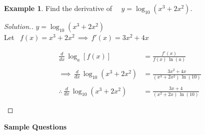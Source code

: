 \documentclass[11pt,a4paper]{article}
\theoremstyle{definition}
\newtheorem{example}[thm]{Example}
\newenvironment{solution}
  {\renewcommand{\qedsymbol}{}\begin{proof}[\textit{Solution}.]}
  {\end{proof}}
\begin{document}
\begin{example}

Find the derivative of $\quad \displaystyle{y = \log_{10}(x^3 + 2x^2)}$.
\end{example}
\begin{solution}

$y = \log_{10}(x^3 + 2x^2)$\\

Let \, $f(x) = x^3 + 2x^2\, \implies\, f'(x) = 3x^2 + 4x$

\begin{align*}
\frac{d}{dx}\, \log_a [f(x)] & = \frac{f'(x)}{f(x) \, \ln (a)}\\\\
\implies\, \frac{d}{dx}\, \log_{10}(x^3 + 2x^2) &  = \frac{3x^2 + 4x}{(x^3 + 2x^2)\, \ln (10)}\\\\
\therefore\, \frac{d}{dx}\, \log_{10}(x^3 + 2x^2) & = \frac{3x + 4}{(x^2 + 2x)\, \ln (10)}\\\\
\end{align*}









\vspace{1cm}
\end{solution}
\textbf{Sample Questions}
\end{document}
